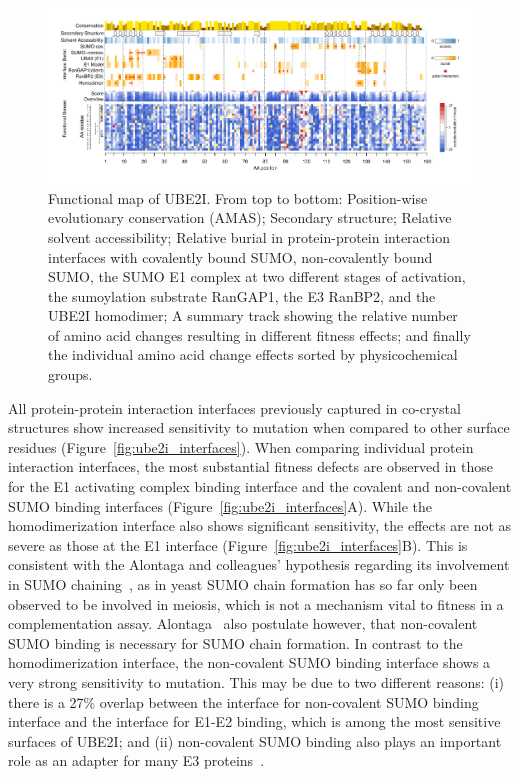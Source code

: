 \begin{landscape}
\begin{figure}[h]
	\centering
	\includegraphics[width=9in]{img/ube2i_map.pdf}
	\caption{Functional map of UBE2I. From top to bottom: Position-wise evolutionary conservation (AMAS); Secondary structure; Relative solvent accessibility; Relative burial in protein-protein interaction interfaces with covalently bound SUMO, non-covalently bound SUMO, the SUMO E1 complex at two different stages of activation, the sumoylation substrate RanGAP1, the E3 RanBP2, and the UBE2I homodimer; A summary track showing the relative number of amino acid changes resulting in different fitness effects; and finally the individual amino acid change effects sorted by physicochemical groups.}
	\label{fig:ube2i-map}
\end{figure}
\end{landscape}


All protein-protein interaction interfaces previously captured in co-crystal structures show increased sensitivity to mutation when compared to other surface residues (Figure~\ref{fig:ube2i_interfaces}). When comparing individual protein interaction interfaces, the most substantial fitness defects are observed in those for the E1 activating complex binding interface and the covalent and non-covalent SUMO binding interfaces (Figure~\ref{fig:ube2i_interfaces}A). While the homodimerization interface also shows significant sensitivity, the effects are not as severe as those at the E1 interface (Figure~\ref{fig:ube2i_interfaces}B). This is consistent with the Alontaga and colleagues' hypothesis regarding its involvement in SUMO chaining~\cite{alontaga_rwd_2015}, as in yeast SUMO chain formation has so far only been observed to be involved in meiosis, which is not a mechanism vital to fitness in a complementation assay. Alontaga \etal\ also postulate however, that non-covalent SUMO binding is necessary for SUMO chain formation. In contrast to the homodimerization interface, the non-covalent SUMO binding interface shows a very strong sensitivity to mutation. This may be due to two different reasons: (i) there is a 27\% overlap between the interface for non-covalent SUMO binding interface and the interface for E1-E2 binding, which is among the most sensitive surfaces of UBE2I; and (ii) non-covalent SUMO binding also plays an important role as an adapter for many E3 proteins~\cite{cappadocia_structural_2015}.


